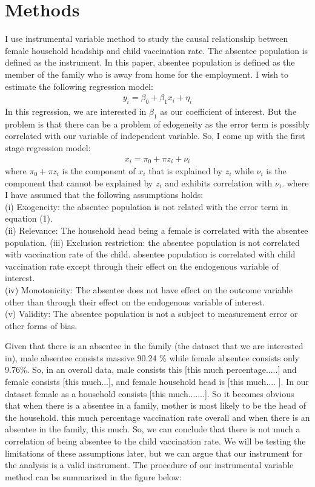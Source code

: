 \documentclass[12pt]{article}
\begin{document}
\section{Methods}
I use instrumental variable method to study the causal relationship between female household headship and child vaccination rate. The absentee population is defined as the instrument. In this paper, absentee population is defined as the member of the family who is away from home for the employment. I wish to estimate the following regression model:
\begin{align}
    y_i = \beta_0 + \beta_1 x_i + \eta_i
\end{align}
In this regression, we are interested in $\beta_1$ as our coefficient of interest. But the problem is that there can be a problem of edogeneity as the error term is possibly correlated with our variable of independent variable. So, I come up with the first stage regression model:
\begin{align}
    x_i = \pi_0 + \pi z_i + \nu_i
\end{align}
where $\pi_0 + \pi z_i$ is the component of $x_i$ that is explained by $z_i$ while $\nu_i$ is the component that cannot be explained by $z_i$ and exhibits correlation with $\nu_i$.
where I have assumed that the following assumptions holds:\\
(i) Exogeneity: the absentee population is not related with the error term in equation (1).\\
(ii) Relevance: The household head being a female is correlated with the absentee population.
(iii) Exclusion restriction: the absentee population is not correlated with vaccination rate of the child. absentee population is correlated with child vaccination rate except through their effect on the endogenous variable of interest.\\
(iv) Monotonicity: The absentee does not have effect on the outcome variable other than through their effect on the endogenous variable of interest.\\
(v) Validity: The absentee population is not a subject to measurement error or other forms of bias.

Given that there is an absentee in the family (the dataset that we are interested in), male absentee consists massive 90.24 \% while female absentee consists only 9.76\%. So, in an overall data, male consists this [this much percentage.....] and female consists [this much...], and female household head is [this much.... ]. In our dataset female as a household consists [this much.......]. So it becomes obvious that when there is a absentee in a family, mother is most likely to be the head of the household. {this much percentage vaccination rate overall and when there is an absentee in the family, this much}. So, we can conclude that there is not much a correlation of being absentee to the child vaccination rate. We will be testing the limitations of these assumptions later, but we can argue that our instrument for the analysis is a valid instrument. The procedure of our instrumental variable method can be summarized in the figure below:
\end{document}

